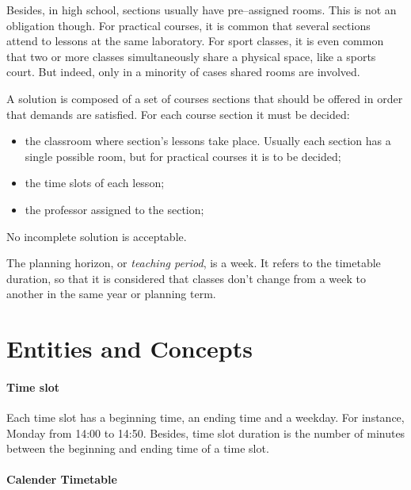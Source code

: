 Besides, in high school, sections usually have pre--assigned rooms. This is not an obligation though. For practical courses, it is common that several sections attend to lessons at the same laboratory. For sport classes, it is even common that two or more classes simultaneously share a physical space, like a sports court. But indeed, only in a minority of cases shared rooms are involved.

A solution is composed of a set of courses sections that should be offered in order that demands are satisfied. For each course section it must be decided:

\begin{itemize}
\item the classroom where section's lessons take place. Usually each section has a single possible room, but for practical courses it is to be decided;
\item the time slots of each lesson;
\item the professor assigned to the section;
\end{itemize}

No incomplete solution is acceptable.

The planning horizon, or \textit{teaching period}, is a week. It refers to the timetable duration, so that it is considered that classes don't change from a week to another in the same year or planning term.
 



\section{Entities and Concepts}
\label{sec:entities}


\paragraph{Time slot}
\label{deftimeslot}

Each time slot has a beginning time, an ending time and a weekday. For instance, Monday from 14:00 to 14:50. Besides, time slot duration is the number of minutes between the beginning and ending time of a time slot.


\paragraph{Calender Timetable}
\label{deftimetable}

